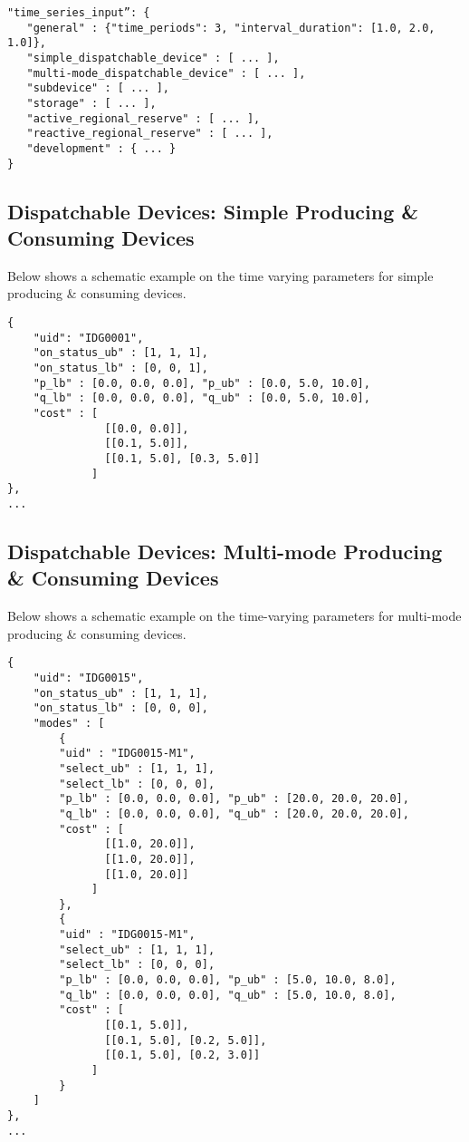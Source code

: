 \begin{verbatim}
"time_series_input”: {
   "general" : {"time_periods": 3, "interval_duration": [1.0, 2.0, 1.0]},   
   "simple_dispatchable_device" : [ ... ],
   "multi-mode_dispatchable_device" : [ ... ],
   "subdevice" : [ ... ],
   "storage" : [ ... ],
   "active_regional_reserve" : [ ... ],
   "reactive_regional_reserve" : [ ... ],
   "development" : { ... }
}    
\end{verbatim}


\subsection{Dispatchable Devices: Simple Producing \& Consuming Devices}
\label{sec:generator_time}
Below shows a schematic example on the time varying parameters for simple producing \& consuming devices.
\begin{verbatim}
{
    "uid": "IDG0001",
    "on_status_ub" : [1, 1, 1],
    "on_status_lb" : [0, 0, 1],
    "p_lb" : [0.0, 0.0, 0.0], "p_ub" : [0.0, 5.0, 10.0],
    "q_lb" : [0.0, 0.0, 0.0], "q_ub" : [0.0, 5.0, 10.0],
    "cost" : [ 
               [[0.0, 0.0]],
               [[0.1, 5.0]],
               [[0.1, 5.0], [0.3, 5.0]] 
             ]
}, 
... 
\end{verbatim}

\subsection{Dispatchable Devices: Multi-mode Producing \& Consuming Devices}
\label{sec:multi-generator_time}
Below shows a schematic example on the time-varying parameters for multi-mode producing \& consuming devices.
\begin{verbatim}
{
    "uid": "IDG0015",
    "on_status_ub" : [1, 1, 1],
    "on_status_lb" : [0, 0, 0],
    "modes" : [
        {
        "uid" : "IDG0015-M1",
        "select_ub" : [1, 1, 1],
        "select_lb" : [0, 0, 0],
        "p_lb" : [0.0, 0.0, 0.0], "p_ub" : [20.0, 20.0, 20.0],
        "q_lb" : [0.0, 0.0, 0.0], "q_ub" : [20.0, 20.0, 20.0],
        "cost" : [ 
               [[1.0, 20.0]],
               [[1.0, 20.0]],
               [[1.0, 20.0]] 
             ]    
        },
        {
        "uid" : "IDG0015-M1",
        "select_ub" : [1, 1, 1],
        "select_lb" : [0, 0, 0],
        "p_lb" : [0.0, 0.0, 0.0], "p_ub" : [5.0, 10.0, 8.0],
        "q_lb" : [0.0, 0.0, 0.0], "q_ub" : [5.0, 10.0, 8.0],
        "cost" : [ 
               [[0.1, 5.0]],
               [[0.1, 5.0], [0.2, 5.0]],
               [[0.1, 5.0], [0.2, 3.0]] 
             ]    
        }    
    ] 
}, 
... 
\end{verbatim}

